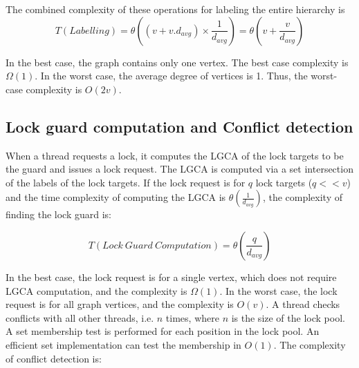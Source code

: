 
The combined complexity of these operations for labeling the entire hierarchy is 
\begin{equation*}
T(Labelling) = 	\theta((v + v.d_{avg}) \times {\frac{1}{d_{avg}}}) = \theta(v+ \frac{v}{d_{avg}})
\end{equation*}


In the best case, the graph contains only one vertex. The best case complexity is $\Omega(1)$.
In the worst case, the average degree of vertices is 1. Thus, the worst-case complexity is $O(2v)$.


\subsection{Lock guard computation and Conflict detection}

When a thread requests a lock, it computes the LGCA of the lock targets to be the guard and issues a lock request. 
The LGCA is computed via a set intersection of the labels of the lock targets. 
If the lock request is for $q$ lock targets ($q << v$) and the time complexity of computing the LGCA is $\theta(\frac{1}{d_{avg}})$, the complexity of finding the lock guard is:

\begin{equation*}
	T(Lock~Guard~Computation) = \theta(\frac{q}{d_{avg}})
\end{equation*}



In the best case, the lock request is for a single vertex, which does not require LGCA computation, and the complexity is $\Omega(1)$. In the worst case, the lock request is for all graph vertices, and the complexity is $O(v)$. A thread checks conflicts with all other threads, i.e. $n$ times, where $n$ is the size of the lock pool. A set membership test is performed for each position in the lock pool. An efficient set implementation can test the membership in $O(1)$. The complexity of conflict detection is:
 
